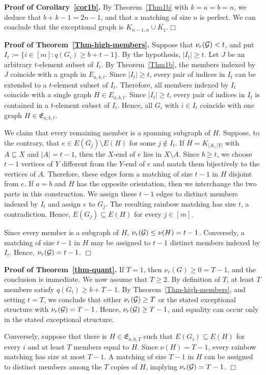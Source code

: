 \documentclass[11pt,a4paper]{article}
\theoremstyle{definition}
\numberwithin{equation}{section}
\def\qed{\hfill$\Box$\vspace{12pt}}
\begin{document}
\noindent \textbf{Proof of Corollary~\ref{cor1b}.}
By Theorem~\ref{Thm1b} with $k=a=b=n$, we deduce that $b+k-1=2n-1$, and that a matching of size $n$ is perfect. We can conclude that the exceptional graph is $K_{n-1,n}\cup\overline{K_1}$.\qed

\noindent \textbf{Proof of Theorem~\ref{Thm-high-members}.}
Suppose that $\nu_r({\cal G})<t$, and put $I_t:=\{i\in[m]:q(G_i)\ge b+t-1\}$.
By the hypothesis, $|I_t|\ge t$. Let $J$ be an arbitrary $t$-element subset of $I_t$. By Theorem~\ref{Thm1b}, the
members indexed by $J$ coincide with a graph in $E_{a,b,t}$. Since $|I_t|\ge t$, every pair of indices in $I_t$ can be extended to a $t$-element subset of $I_t$. Therefore, all members indexed by $I_t$ coincide with a single graph $H\in E_{a,b,t}$. Since $|I_t|\ge t$, every pair of indices in $I_t$ is contained in a $t$-element subset of $I_t$. Hence, all $G_i$ with $i\in I_t$ coincide with one graph $H\in\mathfrak E_{a,b,t}$.

We claim that every remaining member is a spanning subgraph of $H$. Suppose, to the contrary, that $e\in E(G_j)\setminus E(H)$ for some $j\notin I_t$. If $H=K_{|A|,|Y|}$ with $A\subseteq X$ and $|A|=t-1$, then the $X$-end of $e$ lies in $X\setminus A$. Since $b\ge t$, we choose $t-1$ vertices of $Y$ different from the $Y$-end of $e$ and match them bijectively to the vertices of $A$. Therefore, these edges form a matching of size $t-1$ in $H$ disjoint from $e$. If $a=b$ and $H$ has the opposite orientation, then we interchange the two parts in this construction. We assign these $t-1$ edges to distinct members indexed by $I_t$ and assign $e$ to $G_j$. The resulting rainbow matching has size $t$, a contradiction. Hence, $E(G_j)\subseteq E(H)$ for every $j\in[m]$.

Since every member is a subgraph of $H$, $\nu_r({\cal G})\le\nu(H)=t-1$. Conversely, a matching of size $t-1$ in $H$ may be assigned to $t-1$ distinct members indexed by $I_t$. Hence, $\nu_r({\cal G})=t-1$.
\qed

\noindent \textbf{Proof of Theorem~\ref{thm-quant}.}
If $T=1$, then $\nu_r(G)\ge0=T-1$, and the conclusion is immediate. We now assume that \(T\ge2\). By definition of $T$, at least $T$ members satisfy $q(G_i)\ge b+T-1$. By Theorem~\ref{Thm-high-members}, and setting $t=T$, we conclude that either $\nu_r({\cal G})\ge T$ or the stated exceptional structure with $\nu_r({\cal G})=T-1$. Hence, $\nu_r({\cal G})\ge T-1$, and equality can occur only in the stated exceptional structure.

Conversely, suppose that there is $H\in\mathfrak E_{a,b,T}$ such that $E(G_i)\subseteq E(H)$ for every $i$ and at least $T$ members equal to $H$. Since $\nu(H)=T-1$, every rainbow matching has size at most $T-1$. A matching of size $T-1$ in $H$ can be assigned to distinct members among the $T$ copies of $H$, implying $\nu_r({\cal G})=T-1$.
\qed
\end{document}
